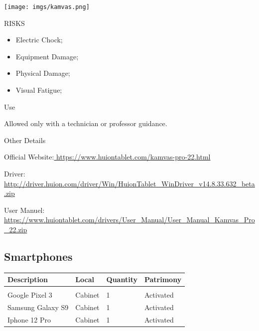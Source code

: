 \begin{multicols}{2}

\texttt{[image: imgs/kamvas.png]}

\columnbreak

\begin{mdframed}[roundcorner=10pt, linecolor=red, linewidth=2pt]
\vspace{1em}
{\Large {\color{red}RISKS}}
\vspace{1em}

\begin{itemize}
    \item Electric Chock;
    \item Equipment Damage;
    \item Physical Damage;
    \item Visual Fatigue; 
\end{itemize}

\vspace{1em}
\end{mdframed}

\vspace{2em}

{\Large Use}
\vspace{1em}

Allowed only with a technician or professor guidance.
\end{multicols}

{\Large Other Details}
\vspace{1em}

Official Website:\url{ https://www.huiontablet.com/kamvas-pro-22.html}

Driver: \url{http://driver.huion.com/driver/Win/HuionTablet_WinDriver_v14.8.33.632_beta.zip}

User Manuel: \url{https://www.huiontablet.com/drivers/User_Manual/User_Manual_Kamvas_Pro_22.zip}
\newpage


\subsection{Smartphones}
\begin{tabularx}{\textwidth}{ Y  Y  Y  Y }
    \textbf{Description} &  \textbf{Local} &  \textbf{Quantity} & \textbf{Patrimony}\\
    \hline \\
     Google Pixel 3 & Cabinet & 1 & Activated \\
     Samsung Galaxy S9 & Cabinet & 1 & Activated \\
     Iphone 12 Pro & Cabinet & 1 & Activated
\end{tabularx}
\vspace{1cm}

